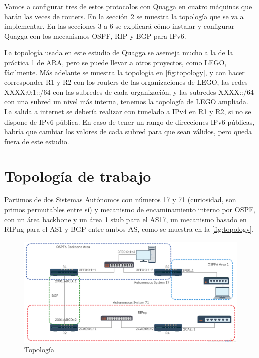 \documentclass{article}
\begin{document}
Vamos a configurar tres de estos protocolos con Quagga en cuatro máquinas que harán las veces de routers. %
En la sección 2 se muestra la topología que se va a implementar. En las secciones 3 a 6 se explicará cómo instalar y configurar Quagga con los mecanismos OSPF, RIP y BGP para IPv6.

La topología usada en este estudio de Quagga se asemeja mucho a la de la práctica 1 de ARA, pero se puede llevar a otros proyectos, como LEGO, fácilmente. Más adelante se muestra la topología en \autoref{fig:topology}, y con hacer corresponder R1 y R2 con los routers de las organizaciones de LEGO, las redes XXXX:0:1::/64 con las subredes de cada organización, y las subredes XXXX::/64 con una subred un nivel más interna, tenemos la topología de LEGO ampliada. La salida a internet se debería realizar con tunelado a IPv4 en R1 y R2, si no se dispone de IPv6 pública. En caso de tener un rango de direcciones IPv6 públicas, habría que cambiar los valores de cada subred para que sean válidos, pero queda fuera de este estudio.

\section{Topología de trabajo}


Partimos de dos Sistemas Autónomos con números 17 y 71 (curiosidad, son primos \hyperref{https://en.wikipedia.org/wiki/Permutable_prime}{}{}{\underline{permutables}}  entre sí) y mecanismo de encaminamiento interno por OSPF, con un área backbone y un área 1 stub para el AS17, un mecanismo basado en RIPng para el AS1 y BGP entre ambos AS, como se muestra en la \autoref{fig:topology}.


\begin{figure}[!h]
	\centering
	\includegraphics[scale=0.29]{images/Topology.png}
	\caption{Topología}
	\label{fig:topology}
\end{figure}
\end{document}
